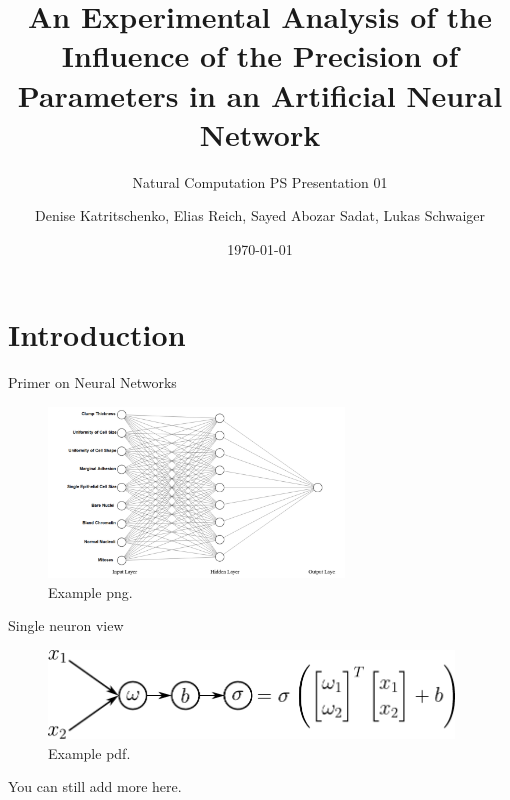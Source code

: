 \documentclass[aspectratio=169]{beamer} %
\title{An Experimental Analysis of the Influence of the Precision of Parameters in an Artificial Neural Network}
\subtitle{Natural Computation PS Presentation 01}
\author[D. K., E. R., S. A. S., L. S.]{Denise Katritschenko, Elias Reich, Sayed Abozar Sadat, Lukas Schwaiger}
\institute[\plusshort]{\pluslong\\ Department of Artificial Intelligence and Human Interfaces (AIHI)}
\date[\today]{\today}
\begin{document}
\frame{\titlepage}


\section{Introduction}


\begin{frame}{Primer on Neural Networks}
  \begin{figure}
    \includegraphics[width=0.7\textwidth]{figures/mlp.png}
    \caption{Example png.}
  \end{figure}
\end{frame}


\begin{frame}{Single neuron view}
  \begin{figure}
    \includegraphics[width=0.96\textwidth]{figures/single-neuron.pdf}
    \caption{Example pdf.}
  \end{figure}

  You can still add more here.
\end{frame}
\end{document}
